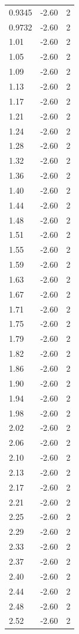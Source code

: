 \begin{longtable}{lrr}
  0.9345 & -2.60 & 2 \\
  0.9732 & -2.60 & 2 \\
  1.01 & -2.60 & 2 \\
  1.05 & -2.60 & 2 \\
  1.09 & -2.60 & 2 \\
  1.13 & -2.60 & 2 \\
  1.17 & -2.60 & 2 \\
  1.21 & -2.60 & 2 \\
  1.24 & -2.60 & 2 \\
  1.28 & -2.60 & 2 \\
  1.32 & -2.60 & 2 \\
  1.36 & -2.60 & 2 \\
  1.40 & -2.60 & 2 \\
  1.44 & -2.60 & 2 \\
  1.48 & -2.60 & 2 \\
  1.51 & -2.60 & 2 \\
  1.55 & -2.60 & 2 \\
  1.59 & -2.60 & 2 \\
  1.63 & -2.60 & 2 \\
  1.67 & -2.60 & 2 \\
  1.71 & -2.60 & 2 \\
  1.75 & -2.60 & 2 \\
  1.79 & -2.60 & 2 \\
  1.82 & -2.60 & 2 \\
  1.86 & -2.60 & 2 \\
  1.90 & -2.60 & 2 \\
  1.94 & -2.60 & 2 \\
  1.98 & -2.60 & 2 \\
  2.02 & -2.60 & 2 \\
  2.06 & -2.60 & 2 \\
  2.10 & -2.60 & 2 \\
  2.13 & -2.60 & 2 \\
  2.17 & -2.60 & 2 \\
  2.21 & -2.60 & 2 \\
  2.25 & -2.60 & 2 \\
  2.29 & -2.60 & 2 \\
  2.33 & -2.60 & 2 \\
  2.37 & -2.60 & 2 \\
  2.40 & -2.60 & 2 \\
  2.44 & -2.60 & 2 \\
  2.48 & -2.60 & 2 \\
  2.52 & -2.60 & 2 \\

\end{longtable}
